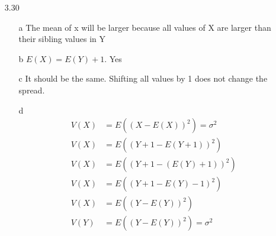 \documentclass[11pt]{article}
\begin{document}
\begin{enumerate}
        \item[3.30]
        \begin{enumerate}
            \item[a] The mean of x will be larger because all values of X are larger than their sibling values in Y
            \item[b] $E(X) = E(Y) + 1$. Yes
            \item[c] It should be the same. Shifting all values by 1 does not change the spread.
            \item[d]
            \begin{align*}
                V(X) &= E((X - E(X))^2) = \sigma^2 \\
                V(X) &= E((Y + 1 - E(Y + 1))^2) \\
                V(X) &= E((Y + 1 - (E(Y) + 1))^2) \\
                V(X) &= E((Y + 1 - E(Y) - 1)^2) \\
                V(X) &= E((Y - E(Y))^2) \\
                V(Y) &= E((Y - E(Y))^2) = \sigma^2
            \end{align*}
        \end{enumerate}
    \end{enumerate}
\end{document}
